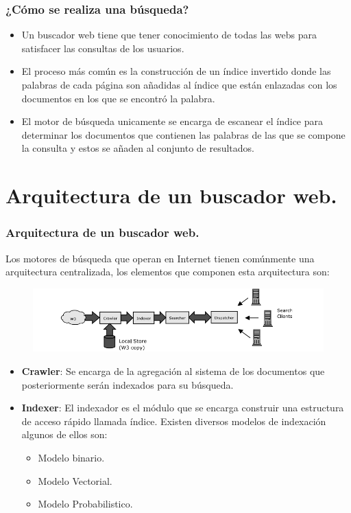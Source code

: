 \documentclass[9pt]{beamer} %
\begin{document}
\begin{frame}
	\frametitle{¿Cómo se realiza una búsqueda?}
	\begin{itemize}
		\item 	Un buscador web tiene que tener conocimiento de todas las webs para satisfacer las consultas de
		los usuarios.
		\item El proceso
		más común es la construcción de un índice invertido donde las palabras de cada página son
		añadidas al índice que están enlazadas con los documentos en los que se encontró la palabra.
		\item El
		motor de búsqueda unicamente se encarga de escanear el índice para determinar los documentos
		que contienen las palabras de las que se compone la consulta y estos se añaden al conjunto de
		resultados.
	\end{itemize}

\end{frame}
\section{Arquitectura de un buscador web.}
\begin{frame}
	\frametitle{Arquitectura de un buscador web.}
Los motores de búsqueda que operan en Internet tienen comúnmente una arquitectura centralizada, los elementos que componen esta arquitectura son:
		\begin{figure}[H]
			\centering
			\includegraphics[scale=0.6]{./img/modeloreferente.png}
		\end{figure}
		\begin{itemize}
			\item \textbf{Crawler}: Se encarga de la agregación al sistema de los documentos que posteriormente serán indexados para su búsqueda.
			\item \textbf{Indexer}: El indexador es el módulo que se encarga construir una estructura de acceso rápido llamada índice.
			Existen diversos modelos de indexación algunos de ellos son:
			\begin{itemize}
				\item Modelo binario.
				\item Modelo Vectorial.
				\item Modelo Probabilistico.
			\end{itemize}

		\end{itemize}
\end{frame}
\end{document}
